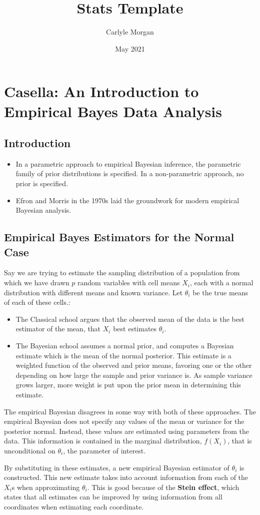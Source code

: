 \documentclass{article}
\title{Stats Template}
\author{Carlyle Morgan}
\date{May 2021}
\begin{document}
\section{Casella: An Introduction to Empirical Bayes Data Analysis}
\subsection{Introduction}
\begin{itemize}
\item In a parametric approach to empirical Bayesian inference, the parametric family of prior distributions is specified. In a non-parametric approach, no prior is specified.
\item Efron and Morris in the 1970s laid the groundwork for modern empirical Bayesian analysis.
\end{itemize}
\subsection{Empirical Bayes Estimators for the Normal Case}

Say we are trying to estimate the sampling distribution of a population from which we have drawn $p$ random variables with cell means $X_i$, each with a normal distribution with different means and known variance. Let $\theta_i$ be the true means of each of these cells.: 
\begin{itemize}
    \item The Classical school argues that the observed mean of the data is the best estimator of the mean, that $X_i$ best estimates $\theta_i$.
    \item The Bayesian school assumes a normal prior, and computes a Bayesian estimate which is the mean of the normal posterior. This estimate is a weighted function of the observed and prior means, favoring one or the other depending on how large the sample and prior variance is. As sample variance grows larger, more weight is put upon the prior mean in determining this estimate.
\end{itemize}

The empirical Bayesian disagrees in some way with both of these approaches. The empirical Bayesian does not specify any values of the mean or variance for the posterior normal. Instead, these values are estimated using parameters from the data. This information is contained in the marginal distribution, $f(X_i)$, that is unconditional on $\theta_i$, the parameter of interest. 

By substituting in these estimates, a new empirical Bayesian estimator of $\theta_i$ is constructed. This new estimate takes into account information from each of the $X_i$s when approximating $\theta_i$. This is good because of the \textbf{Stein effect}, which states that all estimates can be improved by using information from all coordinates when estimating each coordinate. 
\end{document}
